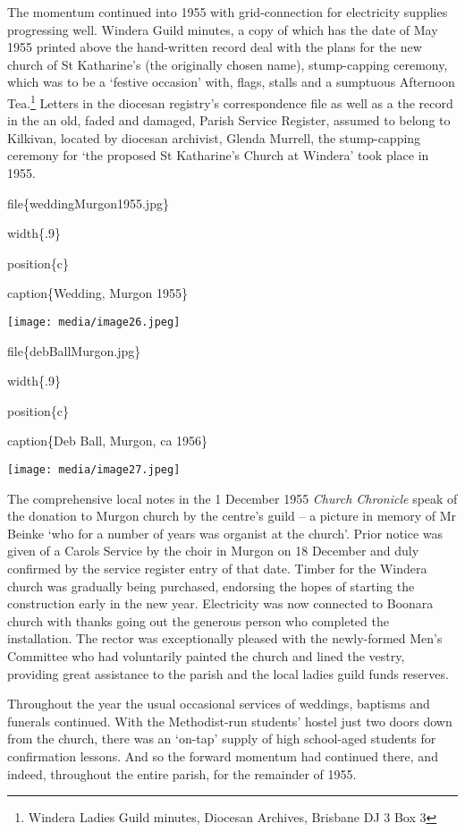The momentum continued into 1955 with grid-connection for electricity supplies progressing well. Windera Guild minutes, a copy of which has the date of May 1955 printed above the hand-written record deal with the plans for the new church of St Katharine's (the originally chosen name), stump-capping ceremony, which was to be a `festive occasion' with, flags, stalls and a sumptuous Afternoon Tea.\footnote{Windera Ladies Guild minutes, Diocesan Archives, Brisbane DJ 3 Box 3} Letters in the diocesan registry's correspondence file as well as a the record in the an old, faded and damaged, Parish Service Register, assumed to belong to Kilkivan, located by diocesan archivist, Glenda Murrell, the stump-capping ceremony for `the proposed St Katharine's Church at Windera' took place in 1955.

file\{weddingMurgon1955.jpg\}

width\{.9\}

position\{c\}

caption\{Wedding, Murgon 1955\}

\texttt{[image: media/image26.jpeg]}

file\{debBallMurgon.jpg\}

width\{.9\}

position\{c\}

caption\{Deb Ball, Murgon, ca 1956\}

\texttt{[image: media/image27.jpeg]}

The comprehensive local notes in the 1 December 1955 \emph{Church Chronicle} speak of the donation to Murgon church by the centre's guild -- a picture in memory of Mr Beinke `who for a number of years was organist at the church'. Prior notice was given of a Carols Service by the choir in Murgon on 18 December and duly confirmed by the service register entry of that date. Timber for the Windera church was gradually being purchased, endorsing the hopes of starting the construction early in the new year. Electricity was now connected to Boonara church with thanks going out the generous person who completed the installation. The rector was exceptionally pleased with the newly-formed Men's Committee who had voluntarily painted the church and lined the vestry, providing great assistance to the parish and the local ladies guild funds reserves.

Throughout the year the usual occasional services of weddings, baptisms and funerals continued. With the Methodist-run students' hostel just two doors down from the church, there was an `on-tap' supply of high school-aged students for confirmation lessons. And so the forward momentum had continued there, and indeed, throughout the entire parish, for the remainder of 1955.

